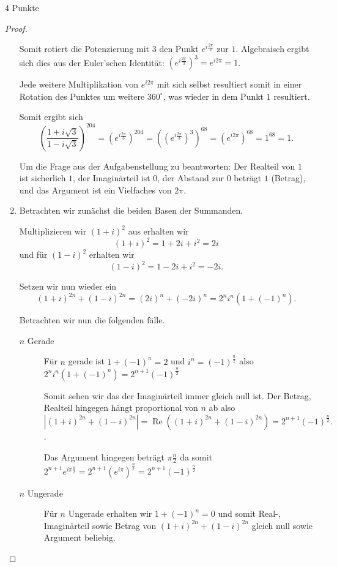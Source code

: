 \documentclass{../problemset}
\begin{document}
\begin{problem}{4 Punkte}
\begin{proof}
\begin{enumerate}
		      Somit rotiert die Potenzierung mit $3$ den Punkt $e^{i\frac{2 \pi }{3}}$ zur
		      $1$. Algebraisch ergibt sich dies aus der Euler'schen Identität: $({e^{i\frac{2
								      \pi }{3}}})^3 = e^{i2\pi} = 1$.

		      Jede weitere Multiplikation von $e^{i2\pi}$ mit sich selbst resultiert somit in
		      einer Rotation des Punktes um weitere $360^\circ$, was wieder in dem Punkt $1$
		      resultiert.

		      Somit ergibt sich
		      \[
			      {\left(\frac{1+i\sqrt{3}}{1-i\sqrt{3}}\right)}^{204}
			      = {(e^{i\frac{2 \pi }{3}} )}^{204}
				      = {({(e^{i\frac{2 \pi }{3}} )}^3)}^{68}
				      = {(e^{i2\pi})}^{68}
				      = 1^{68}
			      = 1.
		      \]

		      Um die Frage aus der Aufgabenstellung zu beantworten: Der Realteil von $1$ ist
		      sicherlich $1$, der Imaginärteil ist $0$, der Abstand zur $0$ beträgt $1$
		      (Betrag), und das Argument ist ein Vielfaches von $2\pi$.

		\item Betrachten wir zunächst die beiden Basen der Summanden.

		      Multiplizieren wir ${(1 + i)}^2$ aus erhalten wir \[
			      {(1 + i)}^2 = 1 + 2i + i^2 = 2i
		      \] und für ${(1 - i)}^2$ erhalten wir \[
			      {(1 - i)}^2 = 1 - 2i + i^2 = -2i.
		      \]

		      Setzen wir nun wieder ein
		      \[
			      (1 + i)^{2n} + (1 - i)^{2n} = {(2i)}^n + {(-2i)}^n = 2^ni^n(1+ {(-1)}^n).
		      \]

		      Betrachten wir nun die folgenden fälle.

		      \begin{description}
			      \item[$n$ Gerade]
			            Für $n$ gerade ist $1+ {(-1)}^n = 2$ und $i^n = {(-1)}^\frac{n}{2}$ also $2^ni^n(1+ {(-1)}^n) = 2^{n+1}{(-1)}^{\frac{n}{2}}$

			            Somit sehen wir das der Imaginärteil immer gleich null ist. Der Betrag,
			            Realteil hingegen hängt proportional von $n$ ab also \[
				            |(1 + i)^{2n} + (1 - i)^{2n}|  = \operatorname{Re}((1 + i)^{2n} + (1 - i)^{2n}) = 2^{n+1}{(-1)}^{\frac{n}{2}}.
			            \].

			            Das Argument hingegen beträgt $\pi \frac{n}{2}$ da somit $2^{n+1}
				            e^{i\pi\frac{n}{2}} = 2^{n+1} {(e^{i\pi})}^\frac{n}{2} =
				            2^{n+1}{(-1)}^{\frac{n}{2}}$
			      \item[$n$ Ungerade]
			            Für $n$ Ungerade erhalten wir $1+ {(-1)}^n = 0$ und somit Real-, Imaginärteil sowie Betrag von $(1 + i)^{2n} + (1 - i)^{2n}$ gleich
			            null sowie Argument beliebig.
		      \end{description}


\end{enumerate}
\end{proof}
\end{problem}
\end{document}
